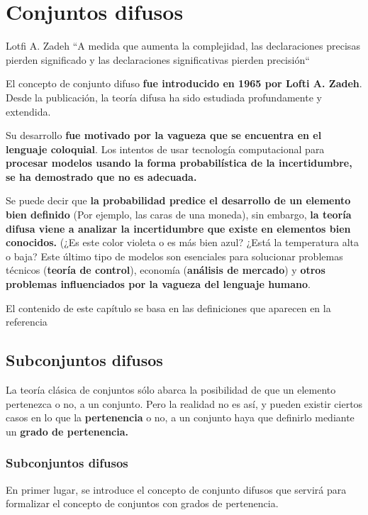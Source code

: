 
\chapter{Conjuntos difusos}
\begin{chapquote}{Lotfi A. Zadeh}
	``A medida que aumenta la complejidad, las declaraciones precisas pierden significado y las declaraciones significativas pierden precisión``
\end{chapquote}
El concepto de conjunto difuso \textbf{fue introducido en 1965 por Lofti A. Zadeh}. Desde la publicación, la teoría difusa ha sido estudiada profundamente y extendida. 

Su desarrollo \textbf{fue motivado por la vagueza que se encuentra en el lenguaje coloquial}. Los intentos de usar tecnología computacional para \textbf{procesar modelos usando la forma probabilística de la incertidumbre, se ha demostrado que no es adecuada.}

Se puede decir que \textbf{la probabilidad predice el desarrollo de un elemento bien definido} (Por ejemplo, las caras de una moneda), sin embargo, \textbf{la teoría difusa viene a analizar la incertidumbre que existe en elementos bien conocidos.} (¿Es este color violeta o es más bien azul? ¿Está la temperatura alta o baja? Este último tipo de modelos son esenciales para solucionar problemas técnicos (\textbf{teoría de control}), economía (\textbf{análisis de mercado}) y \textbf{otros problemas influenciados por la vagueza del lenguaje humano}. \cite{historiafuzzy}

El contenido de este capítulo se basa en las definiciones que aparecen en la referencia \cite{fuzzyintro}

\section{Subconjuntos difusos}
La teoría clásica de conjuntos sólo abarca la posibilidad de que un elemento pertenezca o no, a un conjunto. Pero la realidad no es así, y pueden existir ciertos casos en lo que la \textbf{pertenencia} o no, a un conjunto haya que definirlo mediante un \textbf{grado de pertenencia.}

\subsection{Subconjuntos difusos}
En primer lugar, se introduce el concepto de conjunto difusos que servirá para formalizar el concepto de conjuntos con grados de pertenencia.

